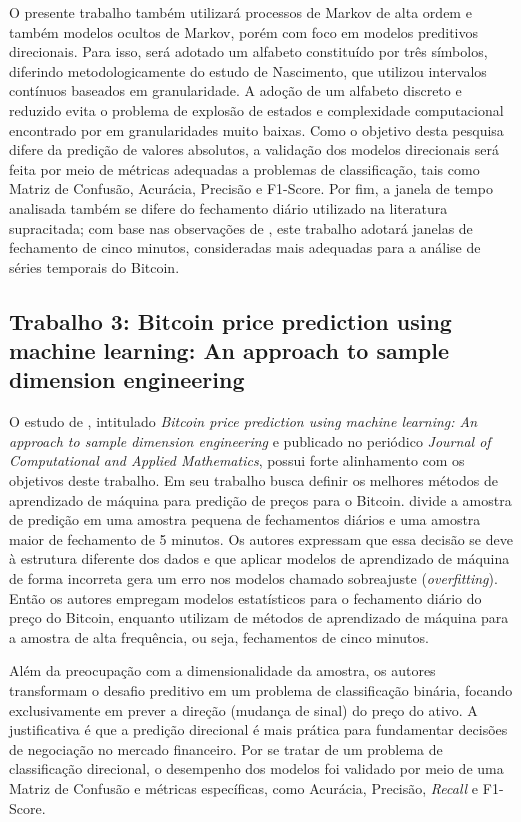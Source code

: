 \documentclass[
    12pt,                %
    openright,           %
    oneside,             %
    a4paper,             %
    english,             %
    brazil               %
]{abntex2}
\begin{document}
O presente trabalho também utilizará processos de Markov de alta ordem e também modelos ocultos de Markov, porém com foco em modelos preditivos direcionais. Para isso, será adotado um alfabeto constituído por três símbolos, diferindo metodologicamente do estudo de Nascimento, que utilizou intervalos contínuos baseados em granularidade. A adoção de um alfabeto discreto e reduzido evita o problema de explosão de estados e complexidade computacional encontrado por  em granularidades muito baixas. Como o objetivo desta pesquisa difere da predição de valores absolutos, a validação dos modelos direcionais será feita por meio de métricas adequadas a problemas de classificação, tais como Matriz de Confusão, Acurácia, Precisão e F1-Score. Por fim, a janela de tempo analisada também se difere do fechamento diário utilizado na literatura supracitada; com base nas observações de , este trabalho adotará janelas de fechamento de cinco minutos, consideradas mais adequadas para a análise de séries temporais do Bitcoin.

\subsection{Trabalho 3: Bitcoin price prediction using machine learning: An approach
to sample dimension engineering}

O estudo de , intitulado \textit{Bitcoin price prediction using machine learning: An approach
to sample dimension engineering} e publicado no periódico \textit{Journal of Computational and Applied Mathematics}, possui forte alinhamento com os objetivos deste trabalho. Em seu trabalho  busca definir os melhores métodos de aprendizado de máquina para predição de preços para o Bitcoin.  divide a amostra de predição em uma amostra pequena de fechamentos diários e uma amostra maior de fechamento de 5 minutos. Os autores expressam que essa decisão se deve à estrutura diferente dos dados e que aplicar modelos de aprendizado de máquina de forma incorreta gera um erro nos modelos chamado sobreajuste (\textit{overfitting}). Então os autores empregam modelos estatísticos para o fechamento diário do preço do Bitcoin, enquanto utilizam de métodos de aprendizado de máquina para a amostra de alta frequência, ou seja, fechamentos de cinco minutos. 

Além da preocupação com a dimensionalidade da amostra, os autores transformam o desafio preditivo em um problema de classificação binária, focando exclusivamente em prever a direção (mudança de sinal) do preço do ativo. A justificativa é que a predição direcional é mais prática para fundamentar decisões de negociação no mercado financeiro. Por se tratar de um problema de classificação direcional, o desempenho dos modelos foi validado por meio de uma Matriz de Confusão e métricas específicas, como Acurácia, Precisão, \textit{Recall} e F1-Score. 
\end{document}
